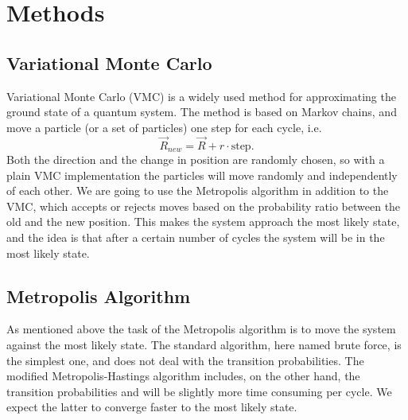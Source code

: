 \documentclass[norsk,a4paper,12pt]{article}
\begin{document}
\section{Methods}
\subsection{Variational Monte Carlo}\label{VMC}
Variational Monte Carlo (VMC) is a widely used method for approximating the ground state of a quantum system. The method is based on Markov chains, and move a particle (or a set of particles) one step for each cycle, i.e.
\begin{equation}
\vec{R}_{new} = \vec{R} + r\cdot \text{step}.
\end{equation}
Both the direction and the change in position are randomly chosen, so with a plain VMC implementation the particles will move randomly and independently of each other. We are going to use the Metropolis algorithm in addition to the VMC, which accepts or rejects moves based on the probability ratio between the old and the new position. This makes the system approach the most likely state, and the idea is that after a certain number of cycles the system will be in the most likely state. 

\subsection{Metropolis Algorithm}
As mentioned above the task of the Metropolis algorithm is to move the system against the most likely state. The standard algorithm, here named brute force, is the simplest one, and does not deal with the transition probabilities. The modified Metropolis-Hastings algorithm includes, on the other hand, the transition probabilities and will be slightly more time consuming per cycle. We expect the latter to converge faster to the most likely state. 
\end{document}
